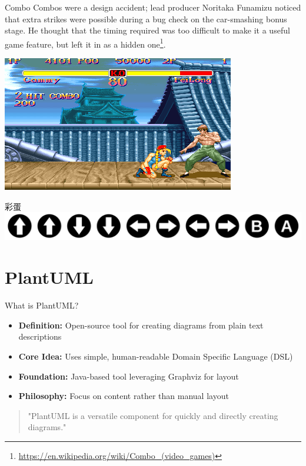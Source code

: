 \documentclass{beamer}
\begin{document}
\begin{frame}[t]{Combo}
    Combos were a design accident; lead producer Noritaka Funamizu noticed that extra strikes were possible during a bug check on the car-smashing bonus stage. He thought that the timing required was too difficult to make it a useful game feature, but left it in as a hidden one\footnote{\url{https://en.wikipedia.org/wiki/Combo_(video_games)}}.

    \includegraphics[width=.5\textwidth]{Super_Street_Fighter_II_screenshot.png}

\end{frame}

\begin{frame}[t]{彩蛋}
    \includegraphics[width=.5\textwidth]{1280px-Konami_Code.svg.png} 
\end{frame}

\section{PlantUML}

\begin{frame}{What is PlantUML?}
    \begin{itemize}
        \item \textbf{Definition:} Open-source tool for creating diagrams from plain text descriptions
        \item \textbf{Core Idea:} Uses simple, human-readable Domain Specific Language (DSL)
        \item \textbf{Foundation:} Java-based tool leveraging Graphviz for layout
        \item \textbf{Philosophy:} Focus on content rather than manual layout
    \end{itemize}
    
    \begin{quote}
        "PlantUML is a versatile component for quickly and directly creating diagrams."
    \end{quote}
\end{frame}
\end{document}
